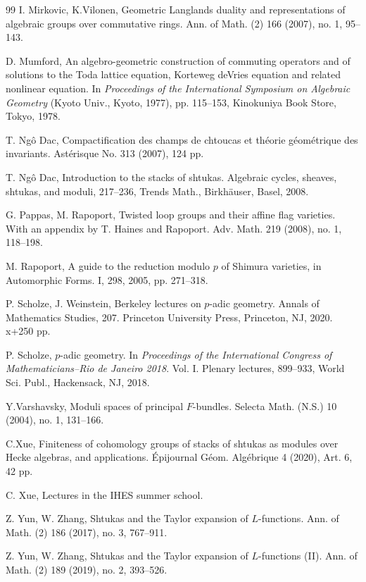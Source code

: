 \begin{thebibliography}{99}
I. Mirkovic, K.Vilonen,
Geometric Langlands duality and representations of algebraic groups over commutative rings. 
Ann. of Math. (2) 166 (2007), no. 1, 95--143.

D. Mumford,
An algebro-geometric construction of commuting operators and of solutions to the Toda lattice equation, Korteweg deVries equation and related nonlinear equation. 
In {\em Proceedings of the International Symposium on Algebraic Geometry} (Kyoto Univ., Kyoto, 1977), pp. 115--153, Kinokuniya Book Store, Tokyo, 1978.

T. Ng\^o Dac,
Compactification des champs de chtoucas et th\'eorie g\'eom\'etrique des invariants.
Ast\'erisque No. 313 (2007), 124 pp.

T. Ng\^o Dac,
Introduction to the stacks of shtukas. 
Algebraic cycles, sheaves, shtukas, and moduli, 217--236, 
Trends Math., Birkh\"auser, Basel, 2008.
 
G. Pappas, M. Rapoport, 
Twisted loop groups and their affine flag varieties. With an appendix by T. Haines and Rapoport. Adv. Math. 219 (2008), no. 1, 118--198. 

M. Rapoport,
A guide to the reduction modulo $p$ of Shimura varieties, 
in Automorphic Forms. I, 298, 2005, pp. 271--318.

P. Scholze, J. Weinstein, 
Berkeley lectures on $p$-adic geometry. 
Annals of Mathematics Studies, 207. 
Princeton University Press, Princeton, NJ, 2020. x+250 pp.

P. Scholze, 
$p$-adic geometry. 
In {\em Proceedings of the International Congress of Mathematicians--Rio de Janeiro 2018}. Vol. I. Plenary lectures, 899--933, World Sci. Publ., Hackensack, NJ, 2018.

Y.Varshavsky, 
Moduli spaces of principal $F$-bundles. 
Selecta Math. (N.S.) 10 (2004), no. 1, 131--166. 

C.Xue,
Finiteness of cohomology groups of stacks of shtukas as modules over Hecke algebras, and applications.
\'Epijournal G\'eom. Alg\'ebrique 4 (2020), Art. 6, 42 pp.

C. Xue,
Lectures in the IHES summer school.

Z. Yun, W. Zhang, 
Shtukas and the Taylor expansion of $L$-functions. 
Ann. of Math. (2) 186 (2017), no. 3, 767--911.

Z. Yun, W. Zhang, 
Shtukas and the Taylor expansion of $L$-functions (II). 
Ann. of Math. (2) 189 (2019), no. 2, 393--526. 


\end{thebibliography}
